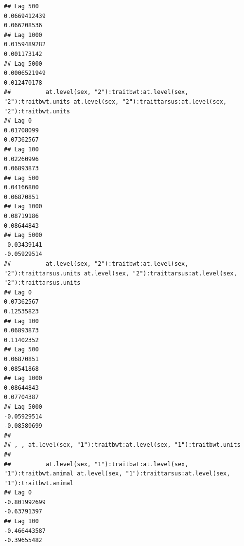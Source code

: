 \documentclass[
  12pt,
]{book}
\begin{document}
\begin{verbatim}
## Lag 500                                                      0.0669412439                                                         0.066208536
## Lag 1000                                                     0.0159489282                                                         0.001173142
## Lag 5000                                                     0.0006521949                                                         0.012470178
##          at.level(sex, "2"):traitbwt:at.level(sex, "2"):traitbwt.units at.level(sex, "2"):traittarsus:at.level(sex, "2"):traitbwt.units
## Lag 0                                                       0.01708099                                                       0.07362567
## Lag 100                                                     0.02260996                                                       0.06893873
## Lag 500                                                     0.04166800                                                       0.06870851
## Lag 1000                                                    0.08719186                                                       0.08644843
## Lag 5000                                                   -0.03439141                                                      -0.05929514
##          at.level(sex, "2"):traitbwt:at.level(sex, "2"):traittarsus.units at.level(sex, "2"):traittarsus:at.level(sex, "2"):traittarsus.units
## Lag 0                                                          0.07362567                                                          0.12535823
## Lag 100                                                        0.06893873                                                          0.11402352
## Lag 500                                                        0.06870851                                                          0.08541868
## Lag 1000                                                       0.08644843                                                          0.07704387
## Lag 5000                                                      -0.05929514                                                         -0.08580699
## 
## , , at.level(sex, "1"):traitbwt:at.level(sex, "1"):traitbwt.units
## 
##          at.level(sex, "1"):traitbwt:at.level(sex, "1"):traitbwt.animal at.level(sex, "1"):traittarsus:at.level(sex, "1"):traitbwt.animal
## Lag 0                                                      -0.801992699                                                       -0.63791397
## Lag 100                                                    -0.466443587                                                       -0.39655482

\end{verbatim}
\end{document}
